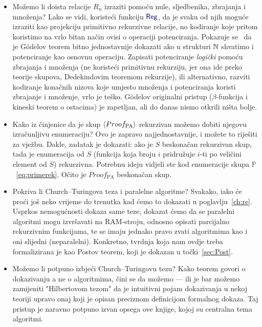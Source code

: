 \begin{itemize}
    \item Možemo li doista relacije $R_n$ izraziti pomoću nule, sljedbenika, zbrajanja i mno\-že\-nja? Lako se vidi, koristeći funkciju $\f{Reg}$, da je svaku od njih moguće izraziti kao projekciju primitivno rekurzivne relacije, no kodiranje koje pritom koristimo na vrlo bitan način ovisi o operaciji potenciranja. Pokazuje se~\cite{smullyan} da je G\"odelov teorem bitno jednostavnije dokazati ako u strukturi ${\mathbb N}$ shvatimo i potenciranje kao osnovnu operaciju. Zapisati potenciranje \emph{logički} pomoću zbrajanja i množenja (ne koristeći primitivnu rekurziju, jer ona ide preko teorije skupova, Dedekindovim teoremom rekurzije), ili alternativno, razviti kodiranje konačnih nizova koje umjesto množenja i potenciranja koristi zbrajanje i množenje, vrlo je teško. G\"odelov originalni pristup ($\beta$-funkcija i kineski teorem o ostacima) je zapetljan, ali do danas nismo otkrili ništa bolje.
    \item Kako iz činjenice da je skup $\langle Proof_{\text{PA}}\rangle$ rekurzivan možemo dobiti njegovu iz\-ra\-čun\-lji\-vu enumeraciju? Ovo je zapravo najjednostavnije, i možete to riješiti za vježbu. Dakle, zadatak je dokazati: ako je $S$ beskonačan rekurzivan skup, tada je enumeracija od $S$ (funkcija koja broju $i$ pridružuje $i$-ti po veličini element od $S$) rekurzivna. Potrebnu ideju vidjeli ste kod enumeracije skupa $\mathbb P$~\eqref{eq:primerek}. Očito je $Proof_{\text{PA}}$ beskonačan skup.
    \item Pokriva li Church--\!Turingova teza i paralelne algoritme? Svakako, iako će proći još neko vrijeme do trenutka kad ćemo to dokazati u poglavlju~\ref{ch:re}. Usprkos nemogućnosti dokaza same teze, dokazat ćemo da se paralelni algoritmi mogu izvršavati na RAM-stroju, odnosno opisati parcijalno rekurzivnim funkcijama, te se imaju jednako pravo zvati algoritmima kao i oni slijedni (neparalelni). Konkretno, tvrdnja koja nam ovdje treba formalizirana je kao Postov teorem, koji je dokazan u točki~\ref{sec:Post}.
    \item Možemo li potpuno izbjeći Church--\!Turingovu tezu? Kako teorem govori o dokazivanju a ne o algoritmima, čini se da možemo --- ili je bar možemo zamijeniti "Hilbertovom tezom" da je intuitivni pojam dokazivanja u nekoj teoriji upravo onaj koji je opisan preciznom definicijom formalnog dokaza. Taj pristup je naravno potpuno izvan opsega ove knjige, kojoj su centralna tema algoritmi.

\end{itemize}
